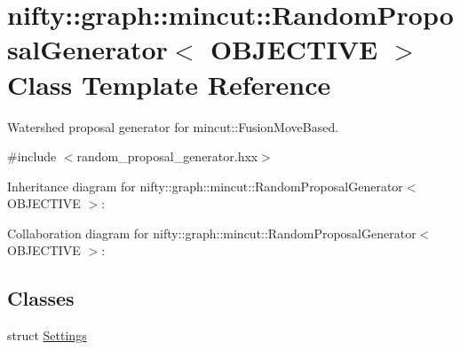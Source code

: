 \hypertarget{classnifty_1_1graph_1_1mincut_1_1RandomProposalGenerator}{}\section{nifty\+:\+:graph\+:\+:mincut\+:\+:Random\+Proposal\+Generator$<$ O\+B\+J\+E\+C\+T\+I\+V\+E $>$ Class Template Reference}
\label{classnifty_1_1graph_1_1mincut_1_1RandomProposalGenerator}


Watershed proposal generator for mincut\+::\+Fusion\+Move\+Based.  




{\ttfamily \#include $<$random\+\_\+proposal\+\_\+generator.\+hxx$>$}



Inheritance diagram for nifty\+:\+:graph\+:\+:mincut\+:\+:Random\+Proposal\+Generator$<$ O\+B\+J\+E\+C\+T\+I\+V\+E $>$\+:


Collaboration diagram for nifty\+:\+:graph\+:\+:mincut\+:\+:Random\+Proposal\+Generator$<$ O\+B\+J\+E\+C\+T\+I\+V\+E $>$\+:
\subsection*{Classes}
\begin{DoxyCompactItemize}
\item 
struct \hyperlink{structnifty_1_1graph_1_1mincut_1_1RandomProposalGenerator_1_1Settings}{Settings}
\end{DoxyCompactItemize}
